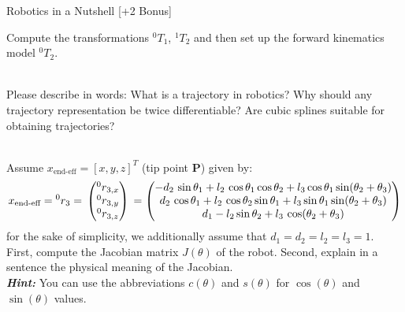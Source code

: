\documentclass[
	ngerman,
	points=true,%
	]{tudaexercise}
\begin{document}
\begin{task}[points=12]{Robotics in a Nutshell [+2 Bonus]}
    \begin{subtask}[title=Forward Kinematics, points=4]{}
        Compute the transformations ${}^0 T_1$, ${}^1 T_2$ and then set up the forward kinematics model ${}^0 T_2$. \\
        
        \todo \\

    \end{subtask}{}
    
    \begin{subtask}[title=Trajectories, points=3]{}
        Please describe in words: What is a trajectory in robotics? Why should any trajectory representation be twice differentiable? Are cubic splines suitable for obtaining trajectories? \\

        \todo \\

    \end{subtask}{}
    
    \begin{subtask}[title=Differential Kinematics, points=4]{}
        Assume $x_\textrm{end-eff}=[x,y,z]^T$ (tip point \textbf{P}) given by:
    \[
        x_\textrm{end-eff} = {}^0 r_3 = \\
        \begin{pmatrix}
            ^0r_{3,x} \\
            ^0r_{3,y} \\
            ^0r_{3,z}
        \end{pmatrix} \\
        = \begin{pmatrix}
            -d_2 \, \sin \theta_1 + l_2 \, \cos \theta_1 \cos \theta_2 + l_3 \cos \theta_1 \sin (\theta_2 +\theta_3) \\
            d_2 \, \cos \theta_1 + l_2 \, \cos \theta_2 \sin \theta_1 + l_3 \sin \theta_1 \sin (\theta_2 +\theta_3) \\
            d_1 - l_2 \sin \theta_2 + l_3 \, \cos (\theta_2 +\theta_3)
        \end{pmatrix} 
    \]
    for the sake of simplicity, we additionally assume that $d_1 = d_2 = l_2 = l_3 = 1$. \\
    First, compute the Jacobian matrix $J(\theta)$ of the robot. Second, explain in a sentence the physical meaning of the Jacobian. \\
    \textbf{\textit{Hint:}} You can use the abbreviations $c(\theta)$ and $s(\theta)$ for $\cos(\theta)$ and $\sin(\theta)$ values. \\


\end{subtask}
\end{task}
\end{document}
